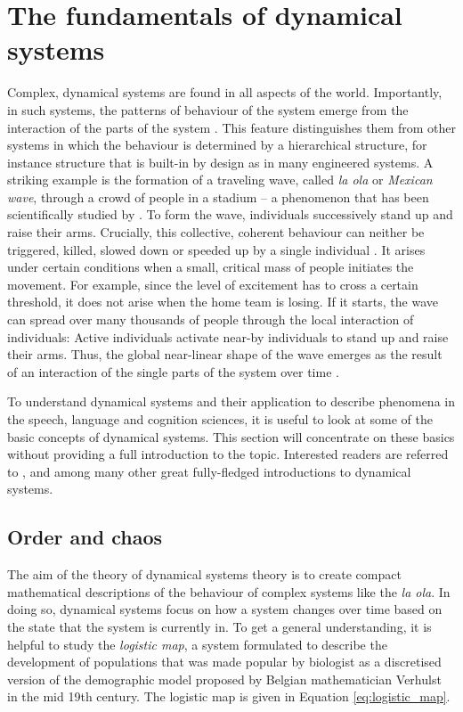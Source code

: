 \section{The fundamentals of dynamical systems}

Complex, dynamical systems are found in all aspects of the world. Importantly, in such systems, the patterns of behaviour of the system emerge from the interaction of the parts of the system \citep{Fuchs2013, deBoer2001}. This feature distinguishes them from other systems in which the behaviour is determined by a hierarchical structure, for instance structure that is built-in by design as in many engineered systems.  A striking example is the formation of a traveling wave, called \emph{la ola} or \emph{Mexican wave}, through a crowd of people in a stadium -- a phenomenon that has been scientifically studied by \citet{FarkasHelbingVicsek2002}. To form the wave, individuals successively stand up and raise their arms. Crucially, this collective, coherent behaviour can neither be triggered, killed, slowed down or speeded up by a single individual \citep{Fuchs2013}. It arises under certain conditions when a small, critical mass of people initiates the movement. For example, since the level of excitement has to cross a certain threshold, it does not arise when the home team is losing. If it starts, the wave can spread over many thousands of people through the local interaction of individuals: Active individuals activate near-by individuals to stand up and raise their arms. Thus, the global near-linear shape of the wave emerges as the result of an interaction of the single parts of the system over time \citep{FarkasHelbingVicsek2002}.

To understand dynamical systems and their application to describe phenomena in the speech, language and cognition sciences, it is useful to look at some of the basic concepts of dynamical systems. This section will concentrate on these basics without providing a full introduction to the topic. Interested readers are referred to \citet{Fuchs2013}, \citet{KaplanGlass1995} and \citet{Iskarous2017} among many other great fully-fledged introductions to dynamical systems.

\subsection{Order and chaos}

The aim of the theory of dynamical systems theory is to create compact mathematical descriptions of the behaviour of complex systems like the \emph{la ola}. In doing so, dynamical systems focus on how a system changes over time based on the state that the system is currently in. To get a general understanding, it is helpful to study the \emph{logistic map}, a system formulated to describe the development of populations that was made popular by biologist \citet{May1976} as a discretised version of the demographic model proposed by Belgian mathematician Verhulst in the mid 19th century. The logistic map is given in Equation \ref{eq:logistic_map}.

